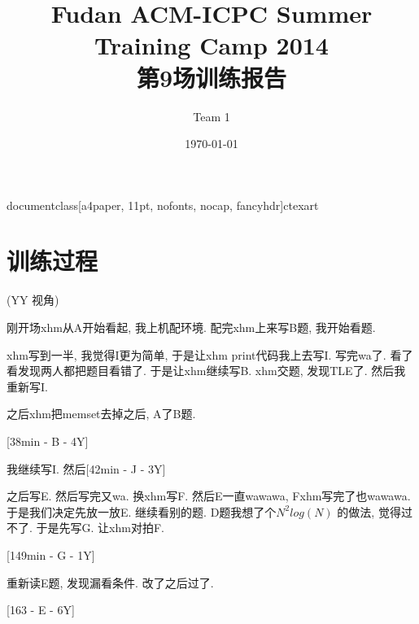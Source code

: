 documentclass[a4paper, 11pt, nofonts, nocap, fancyhdr]{ctexart}
\usepackage{graphicx} 

\usepackage[margin=60pt]{geometry}


\CTEXoptions[today=small]

\pagestyle{plain}




\renewcommand{\thesubsubsection}{Problem \Alph{subsubsection}.}
\newcommand{\problem}[1]{\subsubsection{#1}}

\title{Fudan ACM-ICPC Summer Training Camp 2014\\第9场训练报告}
\author{Team 1}
\date{\today}



\maketitle

\section{训练过程}

(YY 视角)

刚开场xhm从A开始看起, 我上机配环境. 配完xhm上来写B题, 我开始看题.

xhm写到一半, 我觉得I更为简单, 于是让xhm print代码我上去写I. 写完wa了. 看了看发现两人都把题目看错了. 于是让xhm继续写B. xhm交题, 发现TLE了. 然后我重新写I. 

之后xhm把memset去掉之后, A了B题. 

[38min - B - 4Y]

我继续写I. 然后[42min - J - 3Y]

之后写E. 然后写完又wa. 换xhm写F. 然后E一直wawawa, Fxhm写完了也wawawa. 于是我们决定先放一放E. 继续看别的题. D题我想了个$N^2log(N)$ 的做法, 觉得过不了. 于是先写G. 让xhm对拍F.

[149min - G - 1Y]

重新读E题, 发现漏看条件. 改了之后过了. 

[163 - E - 6Y]

